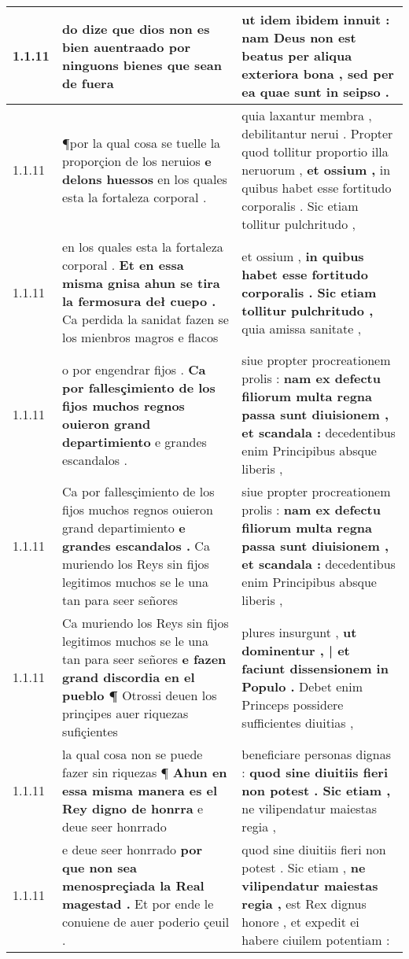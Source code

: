 \begin{tabular}{|p{1cm}|p{6.5cm}|p{6.5cm}|}
1.1.11 & do dize que dios non es bien auentraado \textbf{ por ninguons bienes } que sean de fuera & ut idem ibidem innuit : \textbf{ nam Deus non est beatus per aliqua exteriora bona , } sed per ea quae sunt in seipso . \\\hline
1.1.11 & ¶por la qual cosa se tuelle la proporçion de los neruios \textbf{ e delons huessos } en los quales esta la fortaleza corporal . & quia laxantur membra , debilitantur nerui . Propter quod tollitur proportio illa neruorum , \textbf{ et ossium , } in quibus habet esse fortitudo corporalis . Sic etiam tollitur pulchritudo , \\\hline
1.1.11 & en los quales esta la fortaleza corporal . \textbf{ Et en essa misma gnisa ahun se tira la fermosura deł cuepo . } Ca perdida la sanidat fazen se los mienbros magros e flacos & et ossium , \textbf{ in quibus habet esse fortitudo corporalis . Sic etiam tollitur pulchritudo , } quia amissa sanitate , \\\hline
1.1.11 & o por engendrar fijos . \textbf{ Ca por fallesçimiento de los fijos muchos regnos ouieron grand departimiento } e grandes escandalos . & siue propter procreationem prolis : \textbf{ nam ex defectu filiorum multa regna passa sunt diuisionem , et scandala : } decedentibus enim Principibus absque liberis , \\\hline
1.1.11 & Ca por fallesçimiento de los fijos muchos regnos ouieron grand departimiento \textbf{ e grandes escandalos . } Ca muriendo los Reys sin fijos legitimos muchos se le una tan para seer señores & siue propter procreationem prolis : \textbf{ nam ex defectu filiorum multa regna passa sunt diuisionem , et scandala : } decedentibus enim Principibus absque liberis , \\\hline
1.1.11 & Ca muriendo los Reys sin fijos legitimos muchos se le una tan para seer señores \textbf{ e fazen grand discordia en el pueblo ¶ } Otrossi deuen los prinçipes auer riquezas sufiçientes & plures insurgunt , \textbf{ ut dominentur , | et faciunt dissensionem in Populo . } Debet enim Princeps possidere sufficientes diuitias , \\\hline
1.1.11 & la qual cosa non se puede fazer sin riquezas ¶ \textbf{ Ahun en essa misma manera es el Rey digno de honrra } e deue seer honrrado & beneficiare personas dignas : \textbf{ quod sine diuitiis fieri non potest . Sic etiam , } ne vilipendatur maiestas regia , \\\hline
1.1.11 & e deue seer honrrado \textbf{ por que non sea menospreçiada la Real magestad . } Et por ende le conuiene de auer poderio çeuil . & quod sine diuitiis fieri non potest . Sic etiam , \textbf{ ne vilipendatur maiestas regia , } est Rex dignus honore , et expedit ei habere ciuilem potentiam : \\\hline

\end{tabular}
